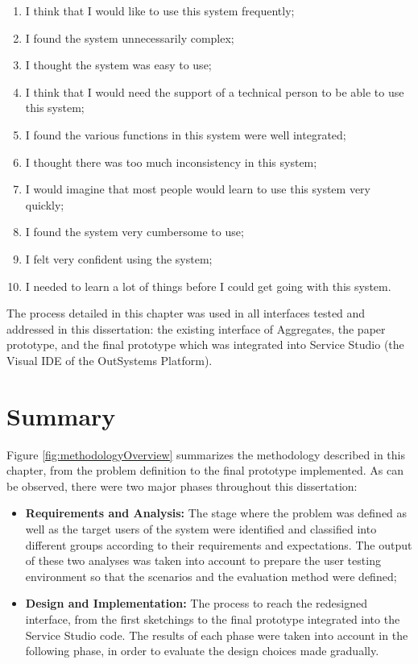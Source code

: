 \begin{enumerate}
    \item I think that I would like to use this system frequently;
    \item I found the system unnecessarily complex;
    \item I thought the system was easy to use;
    \item I think that I would need the support of a technical person to be able to use this system;
    \item I found the various functions in this system were well integrated;
    \item I thought there was too much inconsistency in this system;
    \item I would imagine that most people would learn to use this system very quickly;
    \item I found the system very cumbersome to use;
    \item I felt very confident using the system;
    \item I needed to learn a lot of things before I could get going with this system.
\end{enumerate}

The process detailed in this chapter was used in all interfaces tested and addressed in this dissertation: the existing interface of Aggregates, the paper prototype, and the final prototype which was integrated into Service Studio (the Visual \gls{IDE} of the OutSystems Platform). 

\section{Summary}
\label{sec:summary}
Figure \ref{fig:methodologyOverview} summarizes the methodology described in this chapter, from the problem definition to the final prototype implemented. As can be observed, there were two major phases throughout this dissertation:

\begin{itemize}
    \item \textbf{Requirements and Analysis: } The stage where the problem was defined as well as the target users of the system were identified and classified into different groups according to their requirements and expectations. The output of these two analyses was taken into account to prepare the user testing environment so that the scenarios and the evaluation method were defined;
    \item \textbf{Design and Implementation: } The process to reach the redesigned interface, from the first sketchings to the final prototype integrated into the Service Studio code. The results of each phase were taken into account in the following phase, in order to evaluate the design choices made gradually.
\end{itemize}

